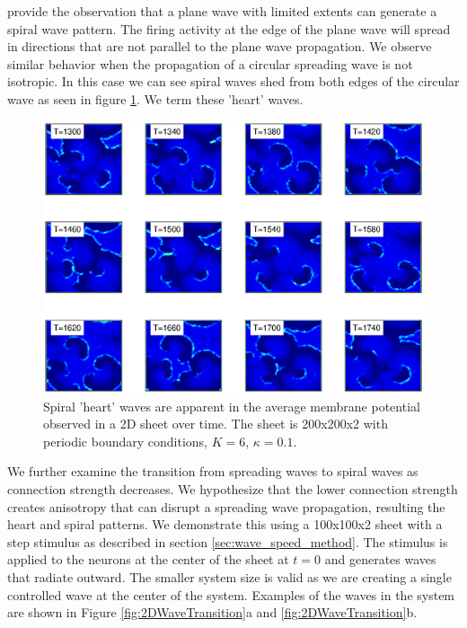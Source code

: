 \citet{Huang2010} provide the observation that a plane wave with limited extents can generate a spiral wave pattern.
The firing activity at the edge of the plane wave will spread in directions that are not parallel to the plane wave propagation.
We observe similar behavior when the propagation of a circular spreading wave is not isotropic.
In this case we can see spiral waves shed from both edges of the circular wave as seen in figure \ref{fig:2DHeartWaves}.
We term these 'heart' waves.
\begin{figure}[!htb]
 \caption{ Spiral 'heart' waves are apparent in the average membrane potential observed in a 2D sheet over time. 
           The sheet is 200x200x2 with periodic boundary conditions, $K=6$, $\kappa=0.1$.
           }
 \label{fig:2DHeartWaves}
 \centering
   \includegraphics[width=\textwidth]{fig/2DSpiralWaves_HeartWaves}
\end{figure}
\FloatBarrier

We further examine the transition from spreading waves to spiral waves as connection strength decreases.
We hypothesize that the lower connection strength creates anisotropy that can disrupt a spreading wave propagation, resulting the heart and spiral patterns. 
We demonstrate this using a 100x100x2 sheet with a step stimulus as described in section \ref{sec:wave_speed_method}.
The stimulus is applied to the neurons at the center of the sheet at $t=0$ and generates waves that radiate outward.
The smaller system size is valid as we are creating a single controlled wave at the center of the system.
Examples of the waves in the system are shown in Figure \ref{fig:2DWaveTransition}a and \ref{fig:2DWaveTransition}b.

